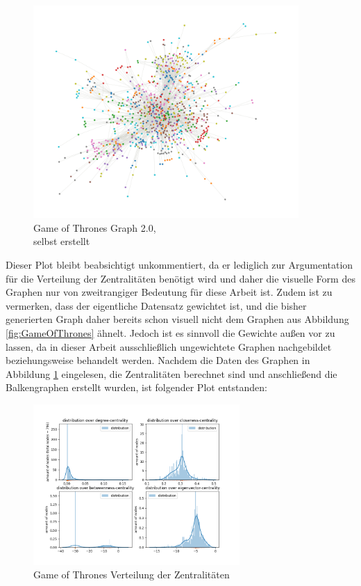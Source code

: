 \FloatBarrier
\begin{figure}[h!]%
  \centering
  \includegraphics[width=0.9\textwidth]{Graphics/GOTPlot.png}
  \caption{Game of Thrones Graph 2.0, \\
  selbst erstellt}
  \label{fig:GOT2.0}
\end{figure}
\FloatBarrier

Dieser Plot bleibt beabsichtigt unkommentiert, da er lediglich zur Argumentation für die Verteilung der Zentralitäten benötigt wird und daher die visuelle Form des Graphen nur von zweitrangiger Bedeutung für diese Arbeit ist. Zudem ist zu vermerken, dass der eigentliche Datensatz gewichtet ist, und die bisher generierten Graph daher bereits schon visuell nicht dem Graphen aus Abbildung \ref{fig:GameOfThrones} ähnelt. Jedoch ist es sinnvoll die Gewichte außen vor zu lassen, da in dieser Arbeit ausschließlich ungewichtete Graphen nachgebildet beziehungsweise behandelt werden. Nachdem die Daten des Graphen in Abbildung \ref{fig:GOT2.0} eingelesen, die Zentralitäten berechnet sind und anschließend die Balkengraphen erstellt wurden, ist folgender Plot entstanden:

\FloatBarrier
\begin{figure}[h!]%
  \centering
   \includegraphics[width=0.7\textwidth]{Graphics/GOT-Distribution.png}
  \caption{Game of Thrones Verteilung der Zentralitäten}
  \label{fig:distributionGOT}
\end{figure}
\FloatBarrier
 
